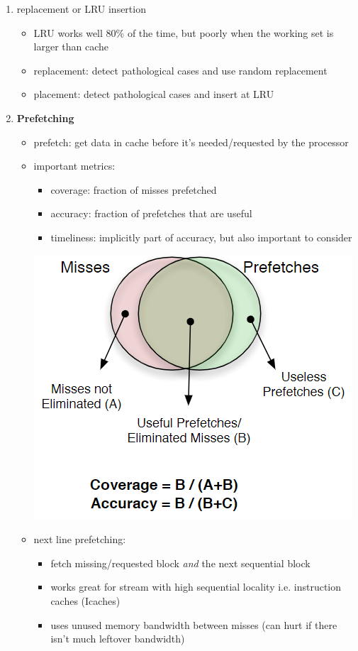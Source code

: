 \documentclass[12pt]{extarticle}
\begin{document}
\begin{enumerate}
		\item replacement or LRU insertion
		\begin{itemize}
			\item LRU works well 80\% of the time, but poorly when the working set is larger than cache
			\item replacement: detect pathological cases and use random replacement
			\item placement: detect pathological cases and insert at LRU
		\end{itemize}

		\item \textbf{Prefetching}
		\begin{itemize}
			\item prefetch: get data in cache before it's needed/requested by the processor
			\item important metrics:
			\begin{itemize}
				\item coverage: fraction of misses prefetched
				\item accuracy: fraction of prefetches that are useful
				\item timeliness: implicitly part of accuracy, but also important to consider
			\end{itemize}

			\begin{center}
				\includegraphics[scale=0.75]{assets/prefetching-metrics-diagram.png}
			\end{center}

			\item next line prefetching:
			\begin{itemize}
				\item fetch missing/requested block \textit{and} the next sequential block
				\item works great for stream with high sequential locality i.e. instruction caches (Icaches)
				\item uses unused memory bandwidth between misses (can hurt if there isn't much leftover bandwidth)
			\end{itemize}


\end{itemize}
\end{enumerate}
\end{document}
